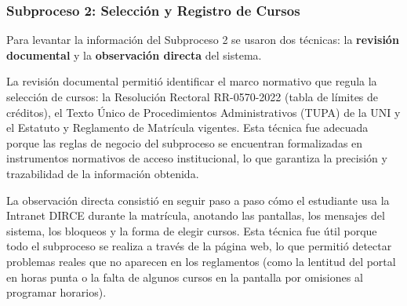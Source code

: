 \subsubsection{Subproceso 2: Selección y Registro de Cursos}

Para levantar la información del Subproceso 2 se usaron dos técnicas: la \textbf{revisión documental} y la \textbf{observación directa} del sistema.

La revisión documental permitió identificar el marco normativo que regula la selección de cursos: la Resolución Rectoral RR-0570-2022 (tabla de límites de créditos), el Texto Único de Procedimientos Administrativos (TUPA) de la UNI y el Estatuto y Reglamento de Matrícula vigentes. Esta técnica fue adecuada porque las reglas de negocio del subproceso se encuentran formalizadas en instrumentos normativos de acceso institucional, lo que garantiza la precisión y trazabilidad de la información obtenida.

La observación directa consistió en seguir paso a paso cómo el estudiante usa la Intranet DIRCE durante la matrícula, anotando las pantallas, los mensajes del sistema, los bloqueos y la forma de elegir cursos. Esta técnica fue útil porque todo el subproceso se realiza a través de la página web, lo que permitió detectar problemas reales que no aparecen en los reglamentos (como la lentitud del portal en horas punta o la falta de algunos cursos en la pantalla por omisiones al programar horarios).
